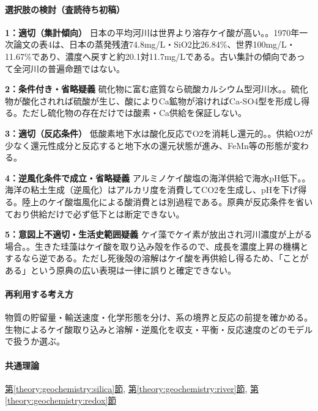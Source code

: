 \paragraph{選択肢の検討（査読待ち初稿）}\mbox{}\par

\noindent\textbf{1：適切（集計傾向）} 日本の平均河川は世界より溶存ケイ酸が高い。。1970年一次論文の表4は、日本の蒸発残渣74.8mg/L・SiO2比26.84\%、世界100mg/L・11.67\%であり、濃度へ戻すと約20.1対11.7mg/Lである。古い集計の傾向であって全河川の普遍命題ではない。\par

\noindent\textbf{2：条件付き・省略疑義} 硫化物に富む底質なら硫酸カルシウム型河川水。。硫化物が酸化されれば硫酸が生じ、酸によりCa鉱物が溶ければCa-SO4型を形成し得る。ただし硫化物の存在だけでは酸素・Ca供給を保証しない。\par

\noindent\textbf{3：適切（反応条件）} 低酸素地下水は酸化反応でO2を消耗し還元的。。供給O2が少なく還元性成分と反応すると地下水の還元状態が進み、FeMn等の形態が変わる。\par

\noindent\textbf{4：逆風化条件で成立・省略疑義} アルミノケイ酸塩の海洋供給で海水pH低下。。海洋の粘土生成（逆風化）はアルカリ度を消費してCO2を生成し、pHを下げ得る。陸上のケイ酸塩風化による酸消費とは別過程である。原典が反応条件を省いており供給だけで必ず低下とは断定できない。\par

\noindent\textbf{5：意図上不適切・生活史範囲疑義} ケイ藻でケイ素が放出され河川濃度が上がる場合。。生きた珪藻はケイ酸を取り込み殻を作るので、成長を濃度上昇の機構とするなら逆である。ただし死後殻の溶解はケイ酸を再供給し得るため、「ことがある」という原典の広い表現は一律に誤りと確定できない。\par

\paragraph{再利用する考え方} 物質の貯留量・輸送速度・化学形態を分け、系の境界と反応の前提を確かめる。生物によるケイ酸取り込みと溶解・逆風化を収支・平衡・反応速度のどのモデルで扱うか選ぶ。

\paragraph{共通理論} \hyperref[theory:geochemistry:silica]{第\ref*{theory:geochemistry:silica}節}, \hyperref[theory:geochemistry:river]{第\ref*{theory:geochemistry:river}節}, \hyperref[theory:geochemistry:redox]{第\ref*{theory:geochemistry:redox}節}


